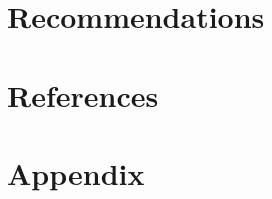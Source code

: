 \documentclass[headsepline,titlepage,twoside,12pt,toc=flat,headings=normal]{scrreprt}
\begin{document}
\iffalse
\begin{table}
%
\end{table}
\begin{table}
%
\end{table}
\begin{table}
%
\end{table}
\begin{table}
%
\end{table}
\begin{table}
%
\end{table}
\begin{table}
\fi

\chapter{Recommendations}\label{ch:introduction}

\chapter{References}\label{ch:introduction}



\chapter{Appendix}\label{ch:appendix}
\end{document}
